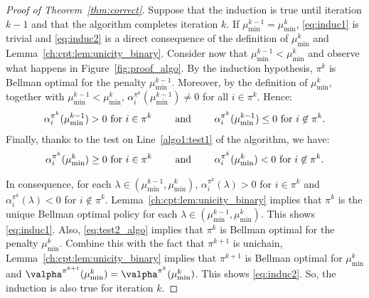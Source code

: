 \begin{proof}[Proof of Theorem~\ref{thm:correct}]
    Suppose that the induction is true until iteration $k-1$ and that the algorithm completes iteration $k$.
    If $\mu^{k-1}_{\min}=\mu^k_{\min}$, \ref{eq:induc1} is trivial and \ref{eq:induc2} is a direct consequence of the definition of $\mu^k_{\min}$ and Lemma~\ref{ch:cpt:lem:unicity_binary}.
    Consider now that $\mu^{k-1}_{\min}<\mu^k_{\min}$ and observe what happens in Figure~\ref{fig:proof_algo}.
    By the induction hypothesis, $\pi^k$ is Bellman optimal for the penalty $\mu^{k-1}_{\min}$.
    Moreover, by the definition of $\mu^k_{\min}$, together with $\mu^{k-1}_{\min}<\mu^k_{\min}$, $\alpha^{\pi^k}_i(\mu^{k-1}_{\min})\ne0$ for all $i\in\pi^k$. Hence:
    \begin{align*}
        \alpha^{\pi^{k}}_i(\mu^{k-1}_{\min})>0 \text{ for $i\in\pi^k$ \qquad and \qquad } \alpha^{\pi^{k}}_i(\mu^{k-1}_{\min})\le0\text{ for $i\not\in\pi^k$}.
    \end{align*}
    Finally, thanks to the test on Line~\ref{algo1:test1} of the algorithm, we have:
    \begin{align}
        \label{eq:test2_algo}
        \alpha^{\pi^{k}}_i(\mu^{k}_{\min})\ge0 \text{ for $i\in\pi^k$ \qquad and \qquad } \alpha^{\pi^{k}}_i(\mu^{k}_{\min})<0\text{ for $i\not\in\pi^k$}.
    \end{align}

    In consequence, for each $\lambda\in(\mu^{k-1}_{\min}, \mu^{k}_{\min})$, $\alpha^{\pi^{k}}_i(\lambda) >0$ for $i\in\pi^{k}$ and $\alpha^{\pi^{k}}_i(\lambda) <0$ for $i\notin\pi^{k}$. Lemma~\ref{ch:cpt:lem:unicity_binary} implies that $\pi^{k}$ is the unique Bellman optimal policy for each $\lambda\in(\mu^{k-1}_{\min}, \mu^{k}_{\min})$. 
    This shows \ref{eq:induc1}.
    Also, \eqref{eq:test2_algo} implies that $\pi^{k}$ is Bellman optimal for the penalty $\mu^{k}_{\min}$.
    Combine this with the fact that $\pi^{k+1}$ is unichain, Lemma~\ref{ch:cpt:lem:unicity_binary} implies that $\pi^{k+1}$ is Bellman optimal for $\mu^{k}_{\min}$ and $\valpha^{\pi^{k+1}}(\mu^{k}_{\min}) =\valpha^{\pi^{k}}(\mu^{k}_{\min})$.
    This shows \ref{eq:induc2}.
    So, the induction is also true for iteration $k$.


\end{proof}
